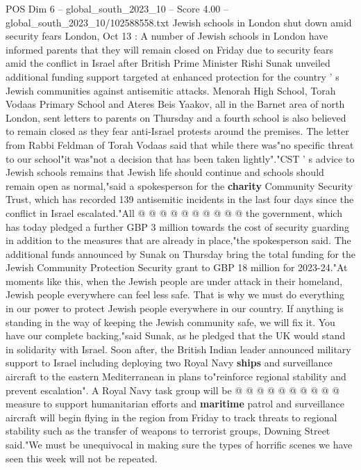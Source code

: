 \begin{textsample}{POS Dim 6 – global\_south\_2023\_10 – Score 4.00 – global\_south\_2023\_10/102588558.txt}  \label{ex:f6_pos_295}
Jewish schools in London shut down amid security fears London, Oct 13 : A number of Jewish schools in London have informed parents that they will remain closed on Friday due to security fears amid the conflict in Israel after British Prime Minister Rishi Sunak unveiled additional funding support targeted at enhanced protection for the country ' s Jewish communities against antisemitic attacks.
Menorah High School, Torah Vodaas Primary School and Ateres Beis Yaakov, all in the Barnet area of north London, sent letters to parents on Thursday and a fourth school is also believed to remain closed as they fear anti-Israel protests around the premises.
The letter from Rabbi Feldman of Torah Vodaas said that while there was"no specific threat to our school"it was"not a decision that has been taken lightly"."CST ' s advice to Jewish schools remains that Jewish life should continue and schools should remain open as normal,"said a spokesperson for the \textbf{charity} Community Security Trust, which has recorded 139 antisemitic incidents in the last four days since the conflict in Israel escalated."All @ @ @ @ @ @ @ @ @ @ the government, which has today pledged a further GBP 3 million towards the cost of security guarding in addition to the measures that are already in place,"the spokesperson said.
The additional funds announced by Sunak on Thursday bring the total funding for the Jewish Community Protection Security grant to GBP 18 million for 2023-24."At moments like this, when the Jewish people are under attack in their homeland, Jewish people everywhere can feel less safe.
That is why we must do everything in our power to protect Jewish people everywhere in our country.
If anything is standing in the way of keeping the Jewish community safe, we will fix it.
You have our complete backing,"said Sunak, as he pledged that the UK would stand in solidarity with Israel.
Soon after, the British Indian leader announced military support to Israel including deploying two Royal Navy \textbf{ships} and surveillance aircraft to the eastern Mediterranean in plans to"reinforce regional stability and prevent escalation".
A Royal Navy task group will be @ @ @ @ @ @ @ @ @ @ measure to support humanitarian efforts and \textbf{maritime} patrol and surveillance aircraft will begin flying in the region from Friday to track threats to regional stability such as the transfer of weapons to terrorist groups, Downing Street said."We must be unequivocal in making sure the types of horrific scenes we have seen this week will not be repeated.

\end{textsample}
